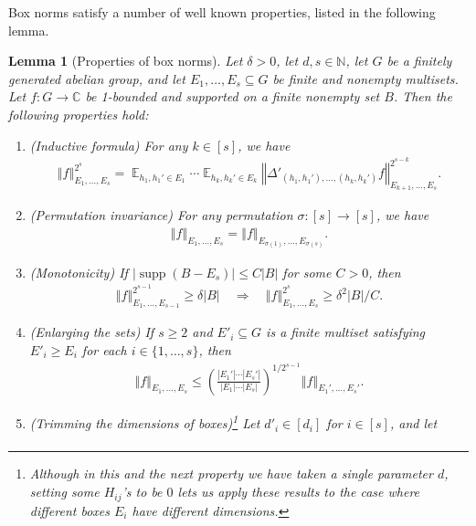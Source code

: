 \documentclass[11pt]{amsart}
\newtheorem{lemma}{Lemma}[section]
\theoremstyle{definition}
\DeclareMathOperator*{\E}{\mathbb{E}}
\newcommand{\C}{{\mathbb C}}
\newcommand{\N}{{\mathbb N}}
\DeclareMathOperator{\supp}{supp}
\newcommand{\norm}[1]{\left\Vert #1\right\Vert}
\newcommand{\brac}[1]{\mathopen{}\left( #1 \mathclose{}\right)}
\begin{document}
Box norms satisfy a number of well known properties, listed in the following lemma.
\begin{lemma}[Properties of box norms]\label{L: properties of box norms}
Let $\delta>0$, let $d,s\in\N$, let $G$ be a finitely generated abelian group, 
and let $E_1, \ldots, E_s\subseteq G$ be finite {and nonempty} multisets. Let $f:G\to\C$ be 1-bounded and supported on a finite nonempty set $B$. Then the following properties hold:
\begin{enumerate}
    \item\label{i: inductive formula} (Inductive formula) For any $k\in[s]$, we have
    \begin{align*}
        \norm{f}_{E_1, \ldots, E_s}^{2^s} = \E_{h_1, h_1'\in E_1}\cdots \E_{h_k, h_k'\in E_k}\norm{\Delta'_{(h_1, h_1'), \ldots, (h_k, h_k')}f}_{E_{k+1}, \ldots, E_s}^{2^{s-k}}.
    \end{align*}
    \item\label{i: permutation invariance} (Permutation invariance) For any permutation $\sigma:[s]\to[s]$, we have 
    \begin{align*}
        \norm{f}_{E_1, \ldots, E_s} = \norm{f}_{E_{\sigma(1)}, \ldots, E_{\sigma(s)}}.
    \end{align*}
    \item\label{i: monotonicity} (Monotonicity) If %
    $|\supp(B-E_s)|\leq C|B|$ for some $C>0$, then
    \begin{align}\label{E: monotonicity}
        \norm{f}_{E_1, \ldots, E_{s-1}}^{2^{s-1}}\geq \delta|B| \quad \Longrightarrow \quad \norm{f}_{E_1, \ldots, E_{s}}^{2^{s}}\geq \delta^2|B|/C.
    \end{align}
    \item\label{i: enlarging} (Enlarging the sets) If $s\geq 2$ and $E'_i\subseteq G$ is a finite multiset satisfying $E'_i \geq E_i$ for each $i\in\{1,\ldots, s\}$, then
    \begin{align*}
        \norm{f}_{E_1, \ldots, E_s}\leq \brac{\frac{|E_1'|\cdots|E_s'|}{|E_1|\cdots|E_s|}}^{1/2^{s-1}}\norm{f}_{E_1', \ldots, E_s'}.
    \end{align*}
    \item\label{i: trimming} (Trimming the dimensions of boxes)\footnote{Although in this and the next property we have taken a single parameter $d$, setting some $H_{ij}$'s to be $0$ lets us apply these results to the case where different boxes $E_i$ have different dimensions.} Let $d'_i\in[d_i]$ for $i\in[s]$, and let
    \begin{align*}

\end{align*}
\end{enumerate}
\end{lemma}
\end{document}
